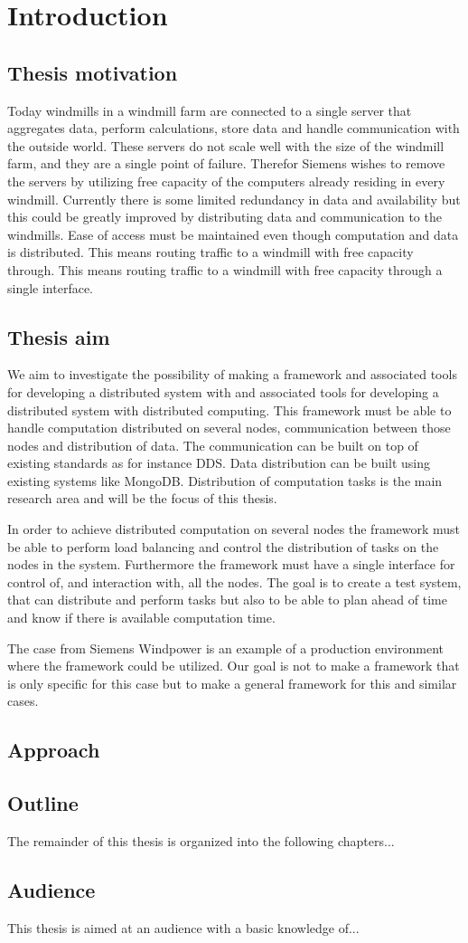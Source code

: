\chapter{Introduction}

\section{Thesis motivation}
Today windmills in a windmill farm are connected to a single server that aggregates data, perform calculations, store data and handle communication with the outside world. 
These servers do not scale well with the size of the windmill farm, and they are a single point of failure. 
Therefor Siemens wishes to remove the servers by utilizing free capacity of the computers already residing in every windmill. 
Currently there is some limited redundancy in data and availability but this could be greatly improved by distributing data and communication to the windmills. 
Ease of access must be maintained even though computation and data is distributed. 
This means routing traffic to a windmill with free capacity through. 
This means routing traffic to a windmill with free capacity through  a single interface.

\section{Thesis aim}
We aim to investigate the possibility of making a framework and associated tools for developing a distributed system with  and associated tools for developing a distributed system with distributed computing. 
This framework must be able to handle computation distributed on several nodes, communication between those nodes and distribution of data. 
The communication can be built on top of existing standards as for instance DDS. Data distribution can be built using existing systems like MongoDB. 
Distribution of computation tasks is the main research area and will be the focus of this thesis.

In order to achieve distributed computation on several nodes the framework must be able to perform load balancing and control the distribution of tasks on the nodes in the system. 
Furthermore the framework must have a single interface for control of, and interaction with, all the nodes.  
The goal is to create a test system, that can distribute and perform tasks but also to be able to plan ahead of time and know if there is available computation time.

The case from Siemens Windpower is an example of a production environment where the framework could be utilized. 
Our goal is not to make a framework that is only  specific for this case but to make a general framework for this and similar cases.

\section{Approach}

\section{Outline}
The remainder of this thesis is organized into the following chapters...

\section{Audience}
This thesis is aimed at an audience with a basic knowledge of...
